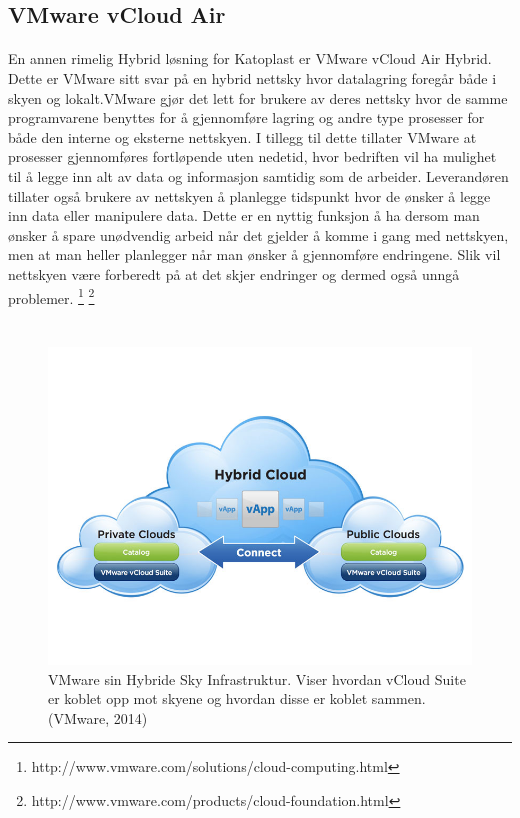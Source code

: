 \subsection{VMware vCloud Air}

\paragraph{} En annen rimelig Hybrid løsning for Katoplast er VMware vCloud Air Hybrid. Dette er VMware sitt svar på en hybrid nettsky hvor datalagring foregår både i skyen og lokalt.VMware gjør det lett for brukere av deres nettsky hvor de samme programvarene benyttes for å gjennomføre lagring og andre type prosesser for både den interne og eksterne nettskyen. I tillegg til dette tillater VMware at prosesser gjennomføres fortløpende uten nedetid, hvor bedriften vil ha mulighet til å legge inn alt av data og informasjon samtidig som de arbeider. Leverandøren tillater også brukere av nettskyen å planlegge tidspunkt hvor de ønsker å legge inn data eller manipulere data. Dette er en nyttig funksjon å ha dersom man ønsker å spare unødvendig arbeid når det gjelder å komme i gang med nettskyen, men at man heller planlegger når man ønsker å gjennomføre endringene. Slik vil nettskyen være forberedt på at det skjer endringer og dermed også unngå problemer.
\footnote{http://www.vmware.com/solutions/cloud-computing.html}
\footnote{http://www.vmware.com/products/cloud-foundation.html}

\section*{}
\begin{figure}[H]
\centering
\includegraphics[width=5.5in]{Bilder/vmware.jpg}
\caption{VMware sin Hybride Sky Infrastruktur. Viser hvordan vCloud Suite er koblet opp mot skyene og hvordan disse er koblet sammen. (VMware, 2014)}
\end{figure}


